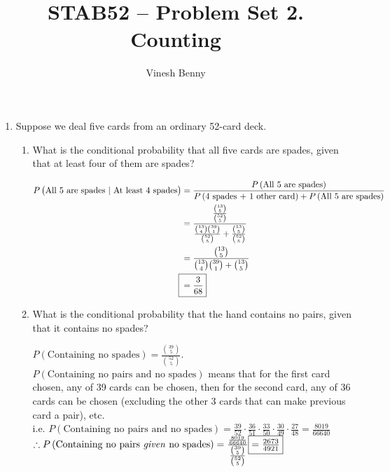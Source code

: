 \documentclass[11pt]{article}
\title{STAB52 -- Problem Set 2. Counting}
\author{Vinesh Benny}
\begin{document}
\begin{enumerate}
	\item Suppose we deal five cards from an ordinary 52-card deck.
	\begin{enumerate}
		\item What is the conditional probability that all five cards are spades, given that at least four of them are spades?
			\begin{mdframed}
				\begin{align*}
					P\left( \text{All 5 are spades } | \text{ At least 4 spades} \right) &= \frac{P\left( \text{All 5 are spades} \right)}{P\left( \text{4 spades + 1 other card} \right) + P\left( \text{All 5 are spades} \right)}\\
					&= \frac{ \frac{\binom{13}{5}}{\binom{52}{5}} }{ \frac{\binom{13}{4}  \binom{39}{1}}{\binom{52}{5}} + \frac{ \binom{13}{5}}{\binom{52}{5}} }\\
					&= \frac{\binom{13}{5}}{\binom{13}{4}  \binom{39}{1} + \binom{13}{5}}\\
					\Aboxed{{} &= \frac{3}{68}}
				\end{align*}
			\end{mdframed}
		\item What is the conditional probability that the hand contains no pairs, given that it contains no spades?
			\begin{mdframed}
				$ P\left( \text{Containing no spades} \right) = \frac{\binom{39}{5}}{\binom{52}{5}}$. $ P\left( \text{Containing no pairs and no spades} \right) $ means that for the first card chosen, any of 39 cards can be chosen, then for the second card, any of 36 cards can be chosen (excluding the other 3 cards that can make previous card a pair), etc.\\
				i.e. $ P\left( \text{Containing no pairs and no spades} \right) = \frac{39}{52} \cdot \frac{36}{51} \cdot \frac{33}{50} \cdot \frac{30}{49} \cdot \frac{27}{48} = \frac{8019}{66640}$\\
				$ \therefore  P\left( \text{Containing no pairs \emph{given} no spades} \right) = \frac{\frac{8019}{66640}}{\frac{\binom{39}{5}}{\binom{52}{5}}} \boxed{= \tfrac{2673}{4921}}$
			\end{mdframed}
	\end{enumerate}


\end{enumerate}
\end{document}
